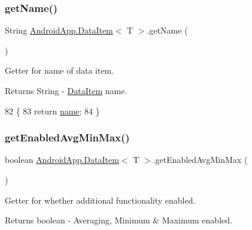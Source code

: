 \subsubsection{\texorpdfstring{get\+Name()}{getName()}}
{\footnotesize\ttfamily String \hyperlink{class_android_app_1_1_data_item}{Android\+App.\+Data\+Item}$<$ T $>$.get\+Name (\begin{DoxyParamCaption}{ }\end{DoxyParamCaption})\hspace{0.3cm}{\ttfamily [inline]}}



Getter for name of data item. 

\begin{DoxyReturn}{Returns}
String -\/ \hyperlink{class_android_app_1_1_data_item}{Data\+Item} name. 
\end{DoxyReturn}

\begin{DoxyCode}
82                             \{
83         \textcolor{keywordflow}{return} \hyperlink{class_android_app_1_1_data_item_a7e6d01c4d449403e707e99fce240b33b}{name};
84     \}
\end{DoxyCode}
\mbox{\label{class_android_app_1_1_data_item_a45f09cabd91cc7032357b02bb0498c3e}} 
\subsubsection{\texorpdfstring{get\+Enabled\+Avg\+Min\+Max()}{getEnabledAvgMinMax()}}
{\footnotesize\ttfamily boolean \hyperlink{class_android_app_1_1_data_item}{Android\+App.\+Data\+Item}$<$ T $>$.get\+Enabled\+Avg\+Min\+Max (\begin{DoxyParamCaption}{ }\end{DoxyParamCaption})\hspace{0.3cm}{\ttfamily [inline]}}



Getter for whether additional functionality enabled. 

\begin{DoxyReturn}{Returns}
boolean -\/ Averaging, Minimum \& Maximum enabled. 
\end{DoxyReturn}

